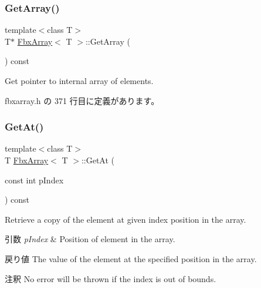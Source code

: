 \mbox{\label{class_fbx_array_a3ac872b6e74391897a028bc87f823979}} 
\subsubsection{\texorpdfstring{Get\+Array()}{GetArray()}}
{\footnotesize\ttfamily template$<$class T$>$ \\
T$\ast$ \hyperlink{class_fbx_array}{Fbx\+Array}$<$ T $>$\+::Get\+Array (\begin{DoxyParamCaption}{ }\end{DoxyParamCaption}) const\hspace{0.3cm}{\ttfamily [inline]}}



Get pointer to internal array of elements. 



 fbxarray.\+h の 371 行目に定義があります。

\mbox{\label{class_fbx_array_a868a1b5f4ee06544665040c08d1dd3ce}} 
\subsubsection{\texorpdfstring{Get\+At()}{GetAt()}}
{\footnotesize\ttfamily template$<$class T$>$ \\
T \hyperlink{class_fbx_array}{Fbx\+Array}$<$ T $>$\+::Get\+At (\begin{DoxyParamCaption}\item[{const int}]{p\+Index }\end{DoxyParamCaption}) const\hspace{0.3cm}{\ttfamily [inline]}}

Retrieve a copy of the element at given index position in the array. 
\begin{DoxyParams}{引数}
{\em p\+Index} & Position of element in the array. \\
\hline
\end{DoxyParams}
\begin{DoxyReturn}{戻り値}
The value of the element at the specified position in the array. 
\end{DoxyReturn}
\begin{DoxyRemark}{注釈}
No error will be thrown if the index is out of bounds. 
\end{DoxyRemark}


